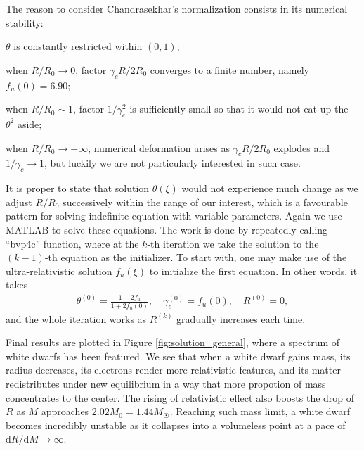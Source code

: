 \documentclass[a4paper,11pt]{article}
\newcommand{\mathdd}{\mathrm{d}}
\numberwithin{equation}{section}
\numberwithin{table}{section}
\numberwithin{figure}{section}
\begin{document}
			The reason to consider Chandrasekhar's normalization consists in its numerical stability: \vspace{-2mm}
			\begin{itemize*}
				\item $\theta$ is constantly restricted within $(0,1)$; 
				\item when $R/R_0\rightarrow 0$, factor $\gamma_cR/2R_0$ converges to a finite number, namely $f_u(0)=6.90$;
				\item when $R/R_0\sim1$, factor $1/\gamma_c^2$ is sufficiently small so that it would not eat up the $\theta^2$ aside;
				\item when $R/R_0\rightarrow+\infty$, numerical deformation arises as $\gamma_cR/2R_0$ explodes and $1/\gamma_c\rightarrow 1$, but luckily we are not particularly interested in such case.
			\end{itemize*} \vspace{-1.5mm}
		
			It is proper to state that solution $\theta(\xi)$ would not experience much change as we adjust $R/R_0$ successively within the range of our interest, which is a favourable pattern for solving indefinite equation with variable parameters. Again we use MATLAB to solve these equations. The work is done by repeatedly calling ``bvp4c'' function, where at the $k$-th iteration we take the solution to the $(k-1)$-th equation as the initializer. To start with, one may make use of the ultra-relativistic solution $f_u(\xi)$ to initialize the first equation. In other words, it takes
			\begin{align}
				\theta^{(0)}=\frac{1+2f_u}{1+2f_u(0)},\quad
				\gamma_c^{(0)}=f_u(0),\quad R^{(0)}=0,
			\end{align}
			and the whole iteration works as $R^{(k)}$ gradually increases each time. 
			
			Final results are plotted in Figure \ref{fig:solution_general}, where a spectrum of white dwarfs has been featured. We see that when a white dwarf gains mass, its radius decreases, its electrons render more relativistic features, and its matter redistributes under new equilibrium in a way that more propotion of mass concentrates to the center. The rising of relativistic effect also boosts the drop of $R$ as $M$ approaches $2.02M_0=1.44M_{\astrosun}$. Reaching such mass limit, a white dwarf becomes incredibly unstable as it collapses into a volumeless point at a pace of $\mathdd R/\mathdd M\rightarrow\infty$. 
			
\end{document}
